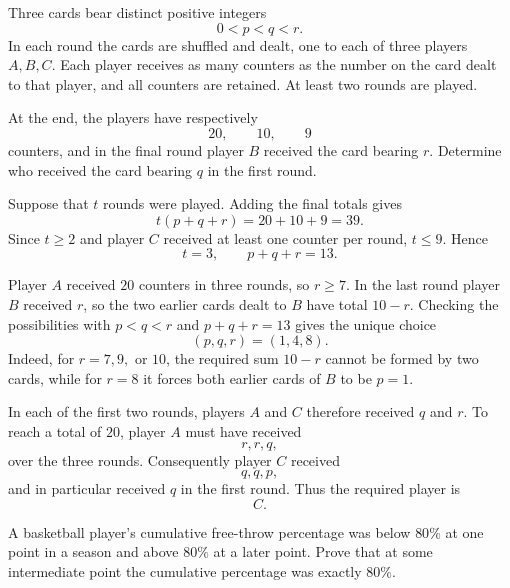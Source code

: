     \begin{expectedproblem}[1974 IMO]
        Three cards bear distinct positive integers
        \[
            0<p<q<r.
        \]
        In each round the cards are shuffled and dealt, one to each of three
        players $A,B,C$. Each player receives as many counters as the number on
        the card dealt to that player, and all counters are retained. At least
        two rounds are played.

        At the end, the players have respectively
        \[
            20,\qquad10,\qquad9
        \]
        counters, and in the final round player $B$ received the card bearing
        $r$. Determine who received the card bearing $q$ in the first round.
    \end{expectedproblem}

    \begin{solution}
        Suppose that $t$ rounds were played. Adding the final totals gives
        \[
            t(p+q+r)=20+10+9=39.
        \]
        Since $t\geq2$ and player $C$ received at least one counter per round,
        $t\leq9$. Hence
        \[
            t=3,
            \qquad
            p+q+r=13.
        \]

        Player $A$ received $20$ counters in three rounds, so $r\geq7$. In the
        last round player $B$ received $r$, so the two earlier cards dealt to
        $B$ have total $10-r$. Checking the possibilities with
        $p<q<r$ and $p+q+r=13$ gives the unique choice
        \[
            (p,q,r)=(1,4,8).
        \]
        Indeed, for $r=7,9,$ or $10$, the required sum $10-r$ cannot be formed
        by two cards, while for $r=8$ it forces both earlier cards of $B$ to be
        $p=1$.

        In each of the first two rounds, players $A$ and $C$ therefore received
        $q$ and $r$. To reach a total of $20$, player $A$ must have received
        \[
            r,r,q,
        \]
        over the three rounds. Consequently player $C$ received
        \[
            q,q,p,
        \]
        and in particular received $q$ in the first round. Thus the required
        player is
        \[
            \boxed{C}.
        \]
    \end{solution}

    \begin{expectedproblem}[2004 Putnam]
        A basketball player's cumulative free-throw percentage was below
        $80\%$ at one point in a season and above $80\%$ at a later point.
        Prove that at some intermediate point the cumulative percentage was
        exactly $80\%$.
    \end{expectedproblem}

